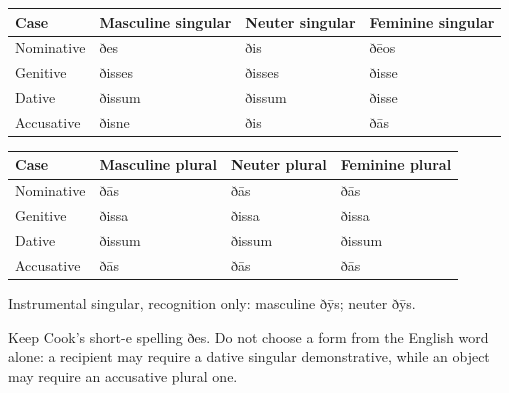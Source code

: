\par\begingroup
\fontsize{10.5}{13.2}\selectfont
\setlength{\LTleft}{0pt}\setlength{\LTright}{\fill}
\noindent
\begin{tabular}{@{}>{\raggedright\arraybackslash}p{22.0mm}>{\raggedright\arraybackslash}p{31.188mm}>{\raggedright\arraybackslash}p{31.188mm}>{\raggedright\arraybackslash}p{31.188mm}@{}}
\toprule
\textbf{Case} & \textbf{Masculine singular} & \textbf{Neuter singular} & \textbf{Feminine singular} \\
\midrule
Nominative & ðes & ðis & ðēos \\
Genitive & ðisses & ðisses & ðisse \\
Dative & ðissum & ðissum & ðisse \\
Accusative & ðisne & ðis & ðās \\
\bottomrule
\end{tabular}
\par\endgroup
\par\addvspace{5pt}
\par\begingroup
\fontsize{10.5}{13.2}\selectfont
\setlength{\LTleft}{0pt}\setlength{\LTright}{\fill}
\noindent
\begin{tabular}{@{}>{\raggedright\arraybackslash}p{22.0mm}>{\raggedright\arraybackslash}p{31.188mm}>{\raggedright\arraybackslash}p{31.188mm}>{\raggedright\arraybackslash}p{31.188mm}@{}}
\toprule
\textbf{Case} & \textbf{Masculine plural} & \textbf{Neuter plural} & \textbf{Feminine plural} \\
\midrule
Nominative & ðās & ðās & ðās \\
Genitive & ðissa & ðissa & ðissa \\
Dative & ðissum & ðissum & ðissum \\
Accusative & ðās & ðās & ðās \\
\bottomrule
\end{tabular}
\par\endgroup
Instrumental singular, recognition only: masculine ðȳs; neuter ðȳs.

Keep Cook’s short-e spelling ðes. Do not choose a form from the English word alone: a recipient may require a dative singular demonstrative, while an object may require an accusative plural one.

